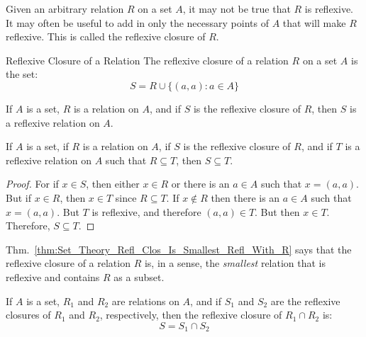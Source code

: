 \documentclass[crop=false,class=book,oneside]{standalone}
\begin{document}
        Given an arbitrary relation $R$ on a set $A$, it may not be
        true that $R$ is reflexive. It may often be useful to add in
        only the necessary points of $A$ that will make $R$ reflexive.
        This is called the reflexive closure of $R$.
        \begin{ldefinition}{Reflexive Closure of a Relation}
            \label{def:Set_Theory_Reflexive_Closure_of_Relation}
            The reflexive closure of a relation $R$ on a set $A$
            is the set:
            \begin{equation}
                S=R\cup\{(a,a):a\in{A}\}
            \end{equation}
        \end{ldefinition}
        \begin{theorem}
            If $A$ is a set, $R$ is a relation on $A$, and if $S$ is the
            reflexive closure of $R$, then $S$ is a reflexive relation on $A$.
        \end{theorem}
        \begin{theorem}
            \label{thm:Set_Theory_Refl_Clos_Is_Smallest_Refl_With_R}
            If $A$ is a set, if $R$ is a relation on $A$, if
            $S$ is the reflexive closure of $R$, and if $T$ is a
            reflexive relation on $A$ such that $R\subseteq{T}$, then
            $S\subseteq{T}$.
        \end{theorem}
        \begin{proof}
            For if $x\in{S}$, then either $x\in{R}$ or there is an
            $a\in{A}$ such that $x=(a,a)$. But if $x\in{R}$, then
            $x\in{T}$ since $R\subseteq{T}$. If $x\notin{R}$ then
            there is an $a\in{A}$ such that $x=(a,a)$. But $T$ is
            reflexive, and therefore $(a,a)\in{T}$. But then
            $x\in{T}$. Therefore, $S\subseteq{T}$.
        \end{proof}
        Thm.~\ref{thm:Set_Theory_Refl_Clos_Is_Smallest_Refl_With_R}
        says that the reflexive closure of a relation $R$ is, in a sense,
        the \textit{smallest} relation that is reflexive and contains
        $R$ as a subset.
        \begin{theorem}
            If $A$ is a set, $R_{1}$ and $R_{2}$ are relations on $A$,
            and if $S_{1}$ and $S_{2}$ are the reflexive closures of
            $R_{1}$ and $R_{2}$, respectively, then the reflexive closure
            of $R_{1}\cap{R}_{2}$ is:
            \begin{equation}
                S=S_{1}\cap{S}_{2}
            \end{equation}
        \end{theorem}
\end{document}
